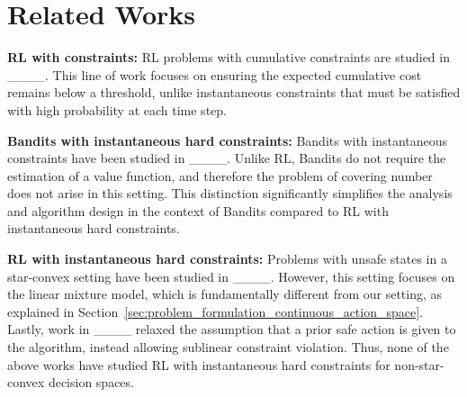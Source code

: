 \section{Related Works}
\label{App:RelatedWorks}
\textbf{RL with constraints:} RL problems with cumulative constraints are studied in 
____. This line of work focuses on ensuring the expected cumulative cost remains below a threshold, unlike instantaneous constraints that must be satisfied with high probability at each time step.

\textbf{Bandits with instantaneous hard constraints:} Bandits with instantaneous constraints have been studied in ____. Unlike RL, Bandits do not require the estimation of a value function, and therefore the problem of covering number does not arise in this setting. This distinction significantly simplifies the analysis and algorithm design in the context of Bandits compared to RL with instantaneous hard constraints.

\textbf{RL with instantaneous hard constraints:} Problems with unsafe states in a star-convex setting have been studied in ____. However, this setting focuses on the linear mixture model, which is fundamentally different from our setting, as explained in Section~\ref{sec:problem_formulation_continuous_action_space}. Lastly, work in ____ relaxed the assumption that a prior safe action is given to the algorithm, instead allowing sublinear constraint violation. Thus, none of the above works have studied RL with instantaneous hard constraints for non-star-convex decision spaces.
